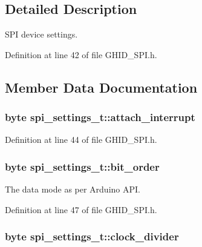 \subsection{\-Detailed \-Description}
\-S\-P\-I device settings. 

\-Definition at line 42 of file \-G\-H\-I\-D\-\_\-\-S\-P\-I.\-h.



\subsection{\-Member \-Data \-Documentation}
\hypertarget{structspi__settings__t_aae2ae572e8d94487413f68c2ed08295d}{
\subsubsection[{attach\-\_\-interrupt}]{\setlength{\rightskip}{0pt plus 5cm}byte {\bf spi\-\_\-settings\-\_\-t\-::attach\-\_\-interrupt}}}\label{structspi__settings__t_aae2ae572e8d94487413f68c2ed08295d}


\-Definition at line 44 of file \-G\-H\-I\-D\-\_\-\-S\-P\-I.\-h.

\hypertarget{structspi__settings__t_ab50d718a4ec202c4077ad3c5170f0864}{
\subsubsection[{bit\-\_\-order}]{\setlength{\rightskip}{0pt plus 5cm}byte {\bf spi\-\_\-settings\-\_\-t\-::bit\-\_\-order}}}\label{structspi__settings__t_ab50d718a4ec202c4077ad3c5170f0864}


\-The data mode as per \-Arduino \-A\-P\-I. 



\-Definition at line 47 of file \-G\-H\-I\-D\-\_\-\-S\-P\-I.\-h.

\hypertarget{structspi__settings__t_a3f4596147a36610d8173f4d8d9655a0b}{
\subsubsection[{clock\-\_\-divider}]{\setlength{\rightskip}{0pt plus 5cm}byte {\bf spi\-\_\-settings\-\_\-t\-::clock\-\_\-divider}}}\label{structspi__settings__t_a3f4596147a36610d8173f4d8d9655a0b}


